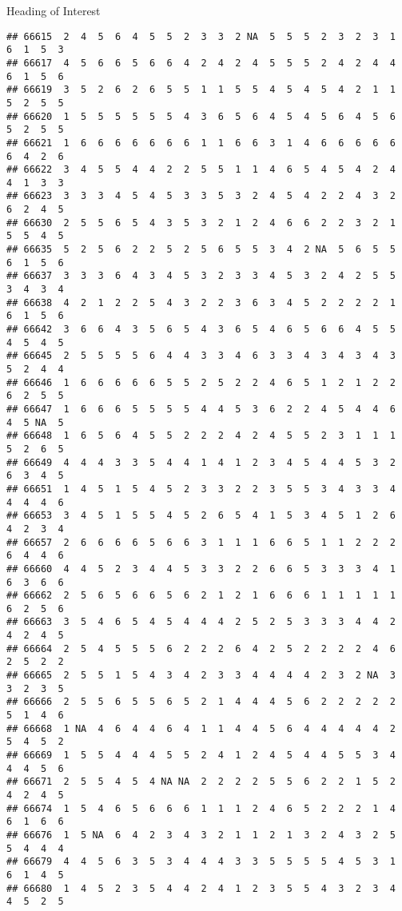 \documentclass[
  ignorenonframetext,
]{beamer}
\begin{document}
\begin{frame}[fragile]{Heading of Interest}
\begin{verbatim}
## 66615  2  4  5  6  4  5  5  2  3  3  2 NA  5  5  5  2  3  2  3  1  6  1  5  3
## 66617  4  5  6  6  5  6  6  4  2  4  2  4  5  5  5  2  4  2  4  4  6  1  5  6
## 66619  3  5  2  6  2  6  5  5  1  1  5  5  4  5  4  5  4  2  1  1  5  2  5  5
## 66620  1  5  5  5  5  5  5  4  3  6  5  6  4  5  4  5  6  4  5  6  5  2  5  5
## 66621  1  6  6  6  6  6  6  6  1  1  6  6  3  1  4  6  6  6  6  6  6  4  2  6
## 66622  3  4  5  5  4  4  2  2  5  5  1  1  4  6  5  4  5  4  2  4  4  1  3  3
## 66623  3  3  3  4  5  4  5  3  3  5  3  2  4  5  4  2  2  4  3  2  6  2  4  5
## 66630  2  5  5  6  5  4  3  5  3  2  1  2  4  6  6  2  2  3  2  1  5  5  4  5
## 66635  5  2  5  6  2  2  5  2  5  6  5  5  3  4  2 NA  5  6  5  5  6  1  5  6
## 66637  3  3  3  6  4  3  4  5  3  2  3  3  4  5  3  2  4  2  5  5  3  4  3  4
## 66638  4  2  1  2  2  5  4  3  2  2  3  6  3  4  5  2  2  2  2  1  6  1  5  6
## 66642  3  6  6  4  3  5  6  5  4  3  6  5  4  6  5  6  6  4  5  5  4  5  4  5
## 66645  2  5  5  5  5  6  4  4  3  3  4  6  3  3  4  3  4  3  4  3  5  2  4  4
## 66646  1  6  6  6  6  6  5  5  2  5  2  2  4  6  5  1  2  1  2  2  6  2  5  5
## 66647  1  6  6  6  5  5  5  5  4  4  5  3  6  2  2  4  5  4  4  6  4  5 NA  5
## 66648  1  6  5  6  4  5  5  2  2  2  4  2  4  5  5  2  3  1  1  1  5  2  6  5
## 66649  4  4  4  3  3  5  4  4  1  4  1  2  3  4  5  4  4  5  3  2  6  3  4  5
## 66651  1  4  5  1  5  4  5  2  3  3  2  2  3  5  5  3  4  3  3  4  4  4  4  6
## 66653  3  4  5  1  5  5  4  5  2  6  5  4  1  5  3  4  5  1  2  6  4  2  3  4
## 66657  2  6  6  6  6  5  6  6  3  1  1  1  6  6  5  1  1  2  2  2  6  4  4  6
## 66660  4  4  5  2  3  4  4  5  3  3  2  2  6  6  5  3  3  3  4  1  6  3  6  6
## 66662  2  5  6  5  6  6  5  6  2  1  2  1  6  6  6  1  1  1  1  1  6  2  5  6
## 66663  3  5  4  6  5  4  5  4  4  4  2  5  2  5  3  3  3  4  4  2  4  2  4  5
## 66664  2  5  4  5  5  5  6  2  2  2  6  4  2  5  2  2  2  2  4  6  2  5  2  2
## 66665  2  5  5  1  5  4  3  4  2  3  3  4  4  4  4  2  3  2 NA  3  3  2  3  5
## 66666  2  5  5  6  5  5  6  5  2  1  4  4  4  5  6  2  2  2  2  2  5  1  4  6
## 66668  1 NA  4  6  4  4  6  4  1  1  4  4  5  6  4  4  4  4  4  2  5  4  5  2
## 66669  1  5  5  4  4  4  5  5  2  4  1  2  4  5  4  4  5  5  3  4  4  4  5  6
## 66671  2  5  5  4  5  4 NA NA  2  2  2  2  5  5  6  2  2  1  5  2  4  2  4  5
## 66674  1  5  4  6  5  6  6  6  1  1  1  2  4  6  5  2  2  2  1  4  6  1  6  6
## 66676  1  5 NA  6  4  2  3  4  3  2  1  1  2  1  3  2  4  3  2  5  5  4  4  4
## 66679  4  4  5  6  3  5  3  4  4  4  3  3  5  5  5  5  4  5  3  1  6  1  4  5
## 66680  1  4  5  2  3  5  4  4  2  4  1  2  3  5  5  4  3  2  3  4  4  5  2  5

\end{verbatim}
\end{frame}
\end{document}

